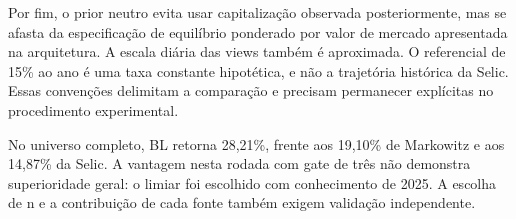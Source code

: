 Por fim, o prior neutro evita usar capitalização observada posteriormente, mas se afasta da especificação de equilíbrio ponderado por valor de mercado apresentada na arquitetura. A escala diária das views também é aproximada. O referencial de 15\% ao ano é uma taxa constante hipotética, e não a trajetória histórica da Selic. Essas convenções delimitam a comparação e precisam permanecer explícitas no procedimento experimental.

No universo completo, BL retorna 28,21\%, frente aos 19,10\% de Markowitz e aos 14,87\% da Selic. A vantagem nesta rodada com gate de três não demonstra superioridade geral: o limiar foi escolhido com conhecimento de 2025. A escolha de n e a contribuição de cada fonte também exigem validação independente.

